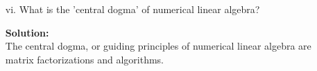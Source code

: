 \documentclass[12pt]{article}
\makeatletter
\theoremstyle{homework}
\newenvironment{exercise}[1]
{\def\@currentlabel{#1}\exercisecore}
{\endexercisecore}
\newcommand{\localhead}[1]{\par\smallskip\noindent\textbf{#1}\nobreak\\}%
\newcommand\solution{\localhead{Solution:}}
\makeatother
\begin{document}
\begin{exercise}{P20}
\begin{enumerate}
  What do you think we will cover?\\
  \solution As we stated in the previous section he have briefly discussed some iterative methods like the 'QR algorithm'. We have also discussed the different 
  matrix ortoginalizations, Householder, and GramShmidt. I think that looking forward we will delve further into the iterative methods for eigen values and solutions to 
  linear equations. 
  \item[vi.] What is the 'central dogma' of numerical linear algebra?\\
  \solution The central dogma, or guiding principles of numerical linear algebra are matrix factorizations and algorithms.  
\end{enumerate}
\end{exercise}
\end{document}
